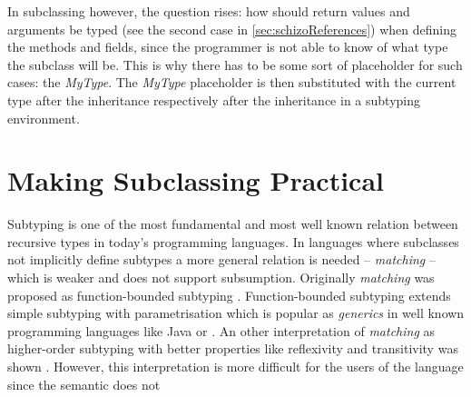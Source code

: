 In subclassing however, the question rises: how should return values and
arguments be typed (see the second case in \cref{sec:schizoReferences})
when defining the methods and fields, since the programmer is not able to
know of what type the subclass will be. This is why there has to be some
sort of placeholder for such cases: the \emph{MyType}. The \emph{MyType}
placeholder is then substituted with the current type after the
inheritance respectively after the inheritance in a subtyping environment.

\chapter{Making Subclassing Practical}
\label{ctr:makingSubclassingPractical}
Subtyping is one of the most fundamental and most well known relation
between recursive types in today's programming languages. In languages
where subclasses not implicitly define subtypes a more general
relation is needed -- \emph{matching} -- which is weaker and does
not support subsumption. Originally \emph{matching} was proposed
as function-bounded subtyping \cite{canning_f-bounded_1989}. Function-bounded
subtyping extends simple subtyping with parametrisation which is popular as
\emph{generics} in well known programming languages like Java or \cs
\cite{barron-estrada_inheritance_2003}. An other interpretation of
\emph{matching} as higher-order subtyping with better properties like
reflexivity and transitivity was shown \cite{abadi_subtyping_1996}. However,
this interpretation is more difficult for the users of the language since
the semantic does not 

